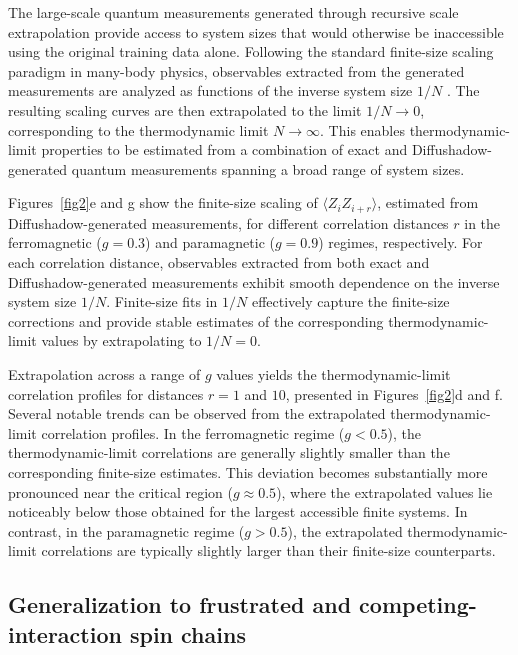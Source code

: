 \documentclass[pdflatex,sn-mathphys-num]{sn-jnl}%
\theoremstyle{thmstyleone}%
\theoremstyle{thmstyletwo}%
\theoremstyle{thmstylethree}%
\begin{document}
The large-scale quantum measurements generated through recursive scale extrapolation provide access to system sizes that would otherwise be inaccessible using the original training data alone. Following the standard finite-size scaling paradigm in many-body physics, observables extracted from the generated measurements are analyzed as functions of the inverse system size $1/N$ \cite{privman1990finite, cardy1996scaling}. The resulting scaling curves are then extrapolated to the limit $1/N \rightarrow 0$, corresponding to the thermodynamic limit $N \rightarrow \infty$. This enables thermodynamic-limit properties to be estimated from a combination of exact and Diffushadow-generated quantum measurements spanning a broad range of system sizes.

Figures~\ref{fig2}e and g show the finite-size scaling of \(\langle Z_i Z_{i+r}\rangle\), estimated from Diffushadow-generated measurements, for different correlation distances \(r\) in the ferromagnetic (\(g=0.3\)) and paramagnetic (\(g=0.9\)) regimes, respectively.
For each correlation distance, observables extracted from both exact and Diffushadow-generated measurements exhibit smooth dependence on the inverse system size $1/N$. Finite-size fits in $1/N$ effectively capture the finite-size corrections and provide stable estimates of the corresponding thermodynamic-limit values by extrapolating to $1/N=0$.

Extrapolation across a range of $g$ values yields the thermodynamic-limit correlation profiles for distances $r = 1$ and $10$, presented in Figures~\ref{fig2}d and f. Several notable trends can be observed from the extrapolated thermodynamic-limit correlation profiles. In the ferromagnetic regime ($g<0.5$), the thermodynamic-limit correlations are generally slightly smaller than the corresponding finite-size estimates. This deviation becomes substantially more pronounced near the critical region ($g\approx0.5$), where the extrapolated values lie noticeably below those obtained for the largest accessible finite systems. In contrast, in the paramagnetic regime ($g>0.5$), the extrapolated thermodynamic-limit correlations are typically slightly larger than their finite-size counterparts.




\subsection{Generalization to frustrated and competing-interaction spin chains}
\end{document}
